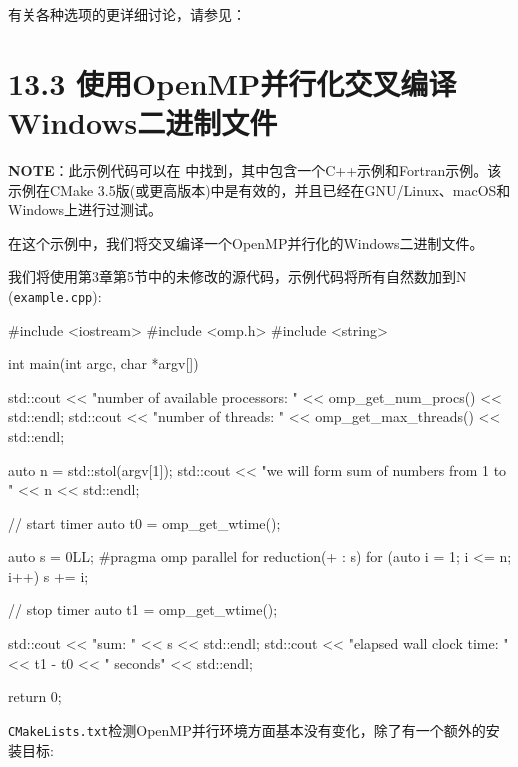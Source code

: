 
有关各种选项的更详细讨论，请参见： 


\section{13.3 使用OpenMP并行化交叉编译Windows二进制文件}

\begin{myInfoBox}
\textbf{NOTE}：此示例代码可以在  中找到，其中包含一个C++示例和Fortran示例。该示例在CMake 3.5版(或更高版本)中是有效的，并且已经在GNU/Linux、macOS和Windows上进行过测试。
\end{myInfoBox}

在这个示例中，我们将交叉编译一个OpenMP并行化的Windows二进制文件。


我们将使用第3章第5节中的未修改的源代码，示例代码将所有自然数加到N (\texttt{example.cpp}):

\begin{codebox}[cpp]
#include <iostream>
#include <omp.h>
#include <string>

int main(int argc, char *argv[]) {
  std::cout << "number of available processors: " << omp_get_num_procs()
  << std::endl;
  std::cout << "number of threads: " << omp_get_max_threads() << std::endl;

  auto n = std::stol(argv[1]);
  std::cout << "we will form sum of numbers from 1 to " << n << std::endl;

  // start timer
  auto t0 = omp_get_wtime();

  auto s = 0LL;
  #pragma omp parallel for reduction(+ : s)
  for (auto i = 1; i <= n; i++) {
    s += i;
  }

  // stop timer
  auto t1 = omp_get_wtime();

  std::cout << "sum: " << s << std::endl;
  std::cout << "elapsed wall clock time: " << t1 - t0 << " seconds" << std::endl;

  return 0;
}
\end{codebox}

\texttt{CMakeLists.txt}检测OpenMP并行环境方面基本没有变化，除了有一个额外的安装目标:

